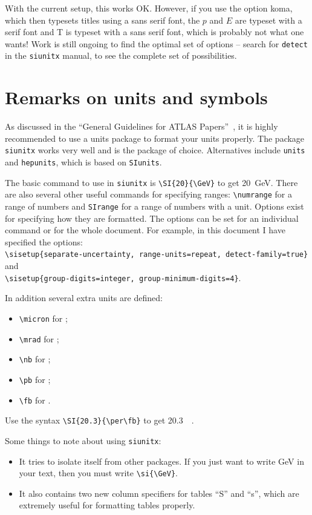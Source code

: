 \documentclass[UKenglish]{latex/atlasdoc}
\newcommand{\Option}[1]{\textsf{#1}\xspace}
\newcommand{\Package}[1]{\texttt{#1}\xspace}
\begin{document}
With the current setup, this works OK. 
However, if you use the option \Option{koma}, which then typesets titles using a sans serif font,
the $p$ and $E$ are typeset with a serif font and \textsf{T} is typeset with a sans serif font,
which is probably not what one wants!
Work is still ongoing to find the optimal set of options
-- search for \texttt{detect} in the \Package{siunitx} manual, to see the complete set of possibilities.


\section{Remarks on units and symbols}

As discussed in the \enquote{General Guidelines for ATLAS Papers}~\cite{atlas-paper},
it is highly recommended to use a units package to format your units properly.
The package \Package{siunitx} works very well and is the package of choice.
Alternatives include \Package{units} and \Package{hepunits},
which is based on \Package{SIunits}.

The basic command to use in \Package{siunitx} is \verb|\SI{20}{\GeV}| to get
\SI{20}{\GeV}. 
There are also several other useful commands for specifying ranges:
\verb|\numrange| for a range of numbers and \verb|SIrange| for a range of numbers with a unit. 
Options exist for specifying how they are formatted.
The options can be set for an individual command or for the whole document.
For example, in this document I have specified the options:\\
\verb|\sisetup{separate-uncertainty, range-units=repeat, detect-family=true}|
and\\
\verb|\sisetup{group-digits=integer, group-minimum-digits=4}|.

In addition several extra units are defined:
\begin{itemize}
\item \verb|\micron| for \si{\micron};
\item \verb|\mrad| for \si{\mrad};
\item \verb|\nb| for \si{\nb};
\item \verb|\pb| for \si{\pb};
\item \verb|\fb| for \si{\fb}.
\end{itemize}
Use the syntax \verb|\SI{20.3}{\per\fb}| to get \SI{20.3}{\per\fb}.

Some things to note about using \Package{siunitx}:
\begin{itemize}
\item It tries to isolate itself from other packages.
  If you just want to write \si{\GeV} in your text,
  then you must write \verb|\si{\GeV}|.
\item It also contains two new column specifiers for tables ``S'' and ``s'',
  which are extremely useful for formatting tables properly.
\end{itemize}
\end{document}
